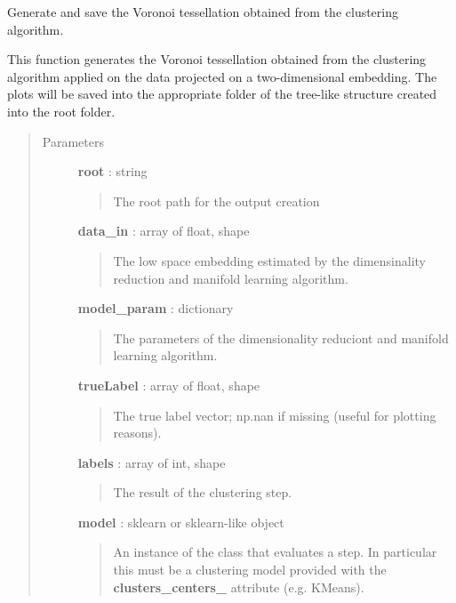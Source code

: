 \documentclass[letterpaper,10pt,english]{sphinxmanual}
\begin{document}
\begin{fulllineitems}
\label{index:adenine.core.analyze_results.make_voronoi}
Generate and save the Voronoi tessellation obtained from the clustering algorithm.

This function generates the Voronoi tessellation obtained from the clustering algorithm applied on the data projected on a two-dimensional embedding. The plots will be saved into the appropriate folder of the tree-like structure created into the root folder.
\begin{quote}\begin{description}
\item[{Parameters}] \leavevmode
\textbf{root} : string
\begin{quote}

The root path for the output creation
\end{quote}

\textbf{data\_in} : array of float, shape
\begin{quote}

The low space embedding estimated by the dimensinality reduction and manifold learning algorithm.
\end{quote}

\textbf{model\_param} : dictionary
\begin{quote}

The parameters of the dimensionality reduciont and manifold learning algorithm.
\end{quote}

\textbf{trueLabel} : array of float, shape
\begin{quote}

The true label vector; np.nan if missing (useful for plotting reasons).
\end{quote}

\textbf{labels} : array of int, shape
\begin{quote}

The result of the clustering step.
\end{quote}

\textbf{model} : sklearn or sklearn-like object
\begin{quote}

An instance of the class that evaluates a step. In particular this must be a clustering model provided with the {\color{red}\bfseries{}clusters\_centers\_} attribute (e.g. KMeans).
\end{quote}

\end{description}\end{quote}

\end{fulllineitems}
\end{document}
